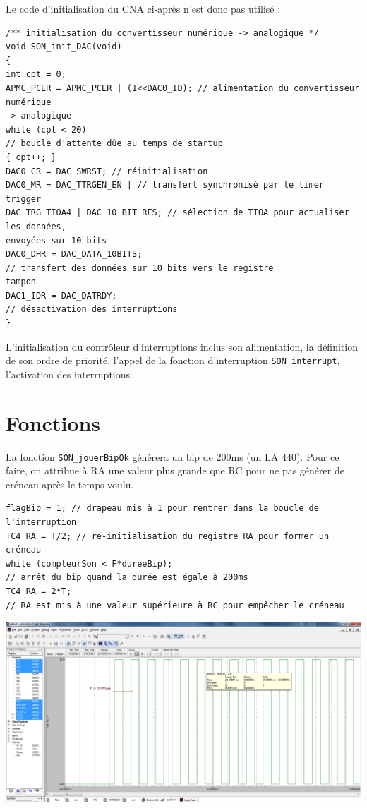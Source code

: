 \documentclass[a4paper]{report}
\begin{document}
Le code d'initialisation du CNA ci-après n'est donc pas utilisé :

\begin{verbatim}
/** initialisation du convertisseur numérique -> analogique */
void SON_init_DAC(void)
{
int cpt = 0;
APMC_PCER = APMC_PCER | (1<<DAC0_ID); // alimentation du convertisseur numérique
-> analogique
while (cpt < 20)
// boucle d'attente dûe au temps de startup
{ cpt++; }
DAC0_CR = DAC_SWRST; // réinitialisation
DAC0_MR = DAC_TTRGEN_EN | // transfert synchronisé par le timer trigger
DAC_TRG_TIOA4 | DAC_10_BIT_RES; // sélection de TIOA pour actualiser les données,
envoyées sur 10 bits
DAC0_DHR = DAC_DATA_10BITS;
// transfert des données sur 10 bits vers le registre
tampon
DAC1_IDR = DAC_DATRDY;
// désactivation des interruptions
}
\end{verbatim}

L'initialisation du contrôleur d'interruptions inclus son alimentation, la définition de son ordre de priorité, l'appel de la fonction d'interruption \texttt{SON\_interrupt}, l'activation des interruptions.

\section{Fonctions}
La fonction \texttt{SON\_jouerBipOk} génèrera un bip de 200ms (un LA 440).
Pour ce faire, on attribue à RA une valeur plus grande que RC pour ne pas générer de créneau après le temps voulu.

\begin{verbatim}
flagBip = 1; // drapeau mis à 1 pour rentrer dans la boucle de l'interruption
TC4_RA = T/2; // ré-initialisation du registre RA pour former un créneau
while (compteurSon < F*dureeBip);
// arrêt du bip quand la durée est égale à 200ms
TC4_RA = 2*T;
// RA est mis à une valeur supérieure à RC pour empêcher le créneau
\end{verbatim}

\begin{center}
	\includegraphics[scale=0.2]{images/SON_fig1.png}
\end{center}
\end{document}
